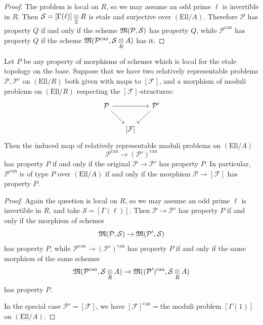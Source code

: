 \begin{proof}
The problem is local on $R$, so we may assume an odd prime $\ell$ is invertible in $R$. Then $\mathcal{S} = [\Gamma(\ell)] \underset{\mathbb{Z}}{\otimes} R$ is etale and surjective over $(\mathrm{Ell}/A)$. Therefore $\mathcal{P}$ has property $Q$ if and only if the scheme $\mathfrak{M}(\mathcal{P}, \mathcal{S})$ has property $Q$, while $\mathcal{P}^{\mathrm{can}}$ has property $Q$ if the scheme $\mathfrak{M}(\mathcal{P}^{\mathrm{can}}, \mathcal{S} \underset{R}{\otimes} A)$ has it.
\end{proof}

\begin{kcor}\label{cor:9.1.9}
Let $P$ be any property of morphisms of schemes which is local for the etale topology on the base. Suppose that we have two relatively representable problems $\mathcal{P}, \mathcal{P}'$ on $(\mathrm{Ell}/R)$ both given with maps to $[\mathcal{F}]$, and a morphism of moduli problems on $(\mathrm{Ell}/R)$ respecting the $[\mathcal{F}]$-structures:
\begin{equation*}
\begin{tikzcd}[row sep=1.8em, column sep=1.5em]
\mathcal{P} \arrow[rr] \arrow[rd] & & \mathcal{P}' \arrow[ld] \\
& {[\mathcal{F}]} &
\end{tikzcd}
\end{equation*}
Then the induced map of relatively representable moduli problems on $(\mathrm{Ell}/A)$
\[
\mathcal{P}^{\mathrm{can}} \to (\mathcal{P}')^{\mathrm{can}}
\]
has property $P$ if and only if the original $\mathcal{P} \to \mathcal{P}'$ has property $P$. In particular, $\mathcal{P}^{\mathrm{can}}$ is of type $P$ over $(\mathrm{Ell}/A)$ if and only if the morphism $\mathcal{P} \to [\mathcal{F}]$ has property $P$.
\end{kcor}

\begin{proof}
Again the question is local on $R$, so we may assume an odd prime $\ell$ is invertible in $R$, and take $\mathcal{S} = [\Gamma(\ell)]$. Then $\mathcal{P} \to \mathcal{P}'$ has property $P$ if and only if the morphism of schemes
\[
\mathfrak{M}(\mathcal{P}, \mathcal{S}) \to \mathfrak{M}(\mathcal{P}', \mathcal{S})
\]
has property $P$, while $\mathcal{P}^{\mathrm{can}} \to (\mathcal{P}')^{\mathrm{can}}$ has property $P$ if and only if the same morphism of the same schemes
\[
\mathfrak{M}(\mathcal{P}^{\mathrm{can}}, \mathcal{S} \underset{R}{\otimes} A) \to \mathfrak{M}((\mathcal{P}')^{\mathrm{can}}, \mathcal{S} \underset{R}{\otimes} A)
\]
has property $P$.

In the special case $\mathcal{P}' = [\mathcal{F}]$, we have $[\mathcal{F}]^{\mathrm{can}} = {}$the moduli problem $[\Gamma(1)]$ on $(\mathrm{Ell}/A)$.
\end{proof}

